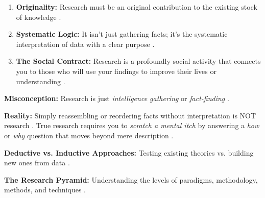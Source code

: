 \documentclass{report}
\begin{document}
\begin{layerTakeaways}
	\begin{enumerate}
		\item \textbf{Originality:} Research must be an original contribution to the existing stock of knowledge
		.
		
		
		\item \textbf{Systematic Logic:} It isn't just gathering facts; it’s the systematic interpretation of data with a clear purpose
		.
		
		
		\item \textbf{The Social Contract:} Research is a profoundly social activity that connects you to those who will use your findings to improve their lives or understanding
		.
	\end{enumerate}
\end{layerTakeaways}

\begin{misconception}
	\textbf{Misconception:} Research is just \textit{intelligence gathering} or \textit{fact-finding}
	.
	
	
	\textbf{Reality:} Simply reassembling or reordering facts without interpretation is NOT research
	. True research requires you to \textit{scratch a mental itch} by answering a \textit{how} or \textit{why} question that moves beyond mere description
	.
\end{misconception}

\begin{optionalExplore}
	\textbf{Deductive vs. Inductive Approaches:} Testing existing theories vs. building new ones from data
	.
	
	
	\textbf{The Research Pyramid:} Understanding the levels of paradigms, methodology, methods, and techniques
	.
\end{optionalExplore}
\end{document}
